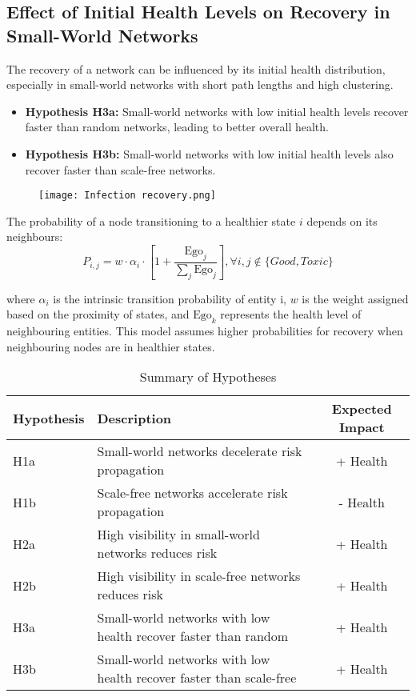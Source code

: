 \documentclass{article}
\begin{document}
\subsection{Effect of Initial Health Levels on Recovery in Small-World Networks}

The recovery of a network can be influenced by its initial health distribution, especially in small-world networks with short path lengths and high clustering.

\begin{itemize}
    \item \textbf{Hypothesis H3a:} Small-world networks with low initial health levels recover faster than random networks, leading to better overall health.
    \item \textbf{Hypothesis H3b:} Small-world networks with low initial health levels also recover faster than scale-free networks.
\end{itemize}

\begin{figure}[h]
  \centering
  \texttt{[image: Infection recovery.png]}
  \caption{}
  \label{fig:figure2}
\end{figure}

The probability of a node transitioning to a healthier state \( i \) depends on its neighbours:
\begin{equation}
P_{i,j} = w \cdot \alpha_i \cdot \left[1 + \frac{\text{Ego}_j}{\sum_j \text{Ego}_j}\right], \forall i, j \notin \{Good, Toxic\}
\end{equation}

where \( \alpha_i \) is the intrinsic transition probability of entity i, \( w \) is the weight assigned based on the proximity of states, and \( \text{Ego}_k \) represents the health level of neighbouring entities. This model assumes higher probabilities for recovery when neighbouring nodes are in healthier states. 

\begin{table}[H]
    \centering
    \caption{Summary of Hypotheses}
    \begin{tabular}{llc}
        \toprule
        Hypothesis & Description & Expected Impact \\
        \midrule
        H1a & Small-world networks decelerate risk propagation & + Health \\
        H1b & Scale-free networks accelerate risk propagation & - Health \\
        H2a & High visibility in small-world networks reduces risk & + Health \\
        H2b & High visibility in scale-free networks reduces risk & + Health \\
        H3a & Small-world networks with low health recover faster than random & + Health \\
        H3b & Small-world networks with low health recover faster than scale-free & + Health \\
        \bottomrule
    \end{tabular}
    \label{tab:hypotheses}
\end{table}
\end{document}
